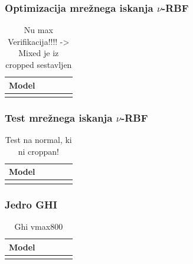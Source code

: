 \subsubsection{Optimizacija mrežnega iskanja \texorpdfstring{$\nu$}{nu}-RBF}
\begin{table}[!htbp]
	\centering
	\begin{tabular}{l S[table-format=1.2, round-mode=places, round-precision=2] S[table-format=1.2, round-mode=places, round-precision=2] S[table-format=1.2, round-mode=places, round-precision=2] S[table-format=1.2, round-mode=places, round-precision=2]}
		\toprule
		\textbf{Model} &  &  &  &  \\
		\midrule
		\bottomrule
	\end{tabular}
	\caption{Nu max Verifikacija!!!! -> Mixed je iz cropped sestavljen}
	\label{tab:nu-max}
\end{table}




\subsubsection{Test mrežnega iskanja \texorpdfstring{$\nu$}{nu}-RBF}
\begin{table}[!htbp]
	\centering
	\begin{tabular}{l S[table-format=1.2, round-mode=places, round-precision=2] S[table-format=1.2, round-mode=places, round-precision=2] S[table-format=1.2, round-mode=places, round-precision=2] S[table-format=1.2, round-mode=places, round-precision=2]}
		\toprule
		\textbf{Model} &  &  &  &  \\
		\midrule
		\bottomrule
	\end{tabular}
	\caption{Test na normal, ki ni croppan!}
	\label{tab:rbf-nu}
\end{table}





\subsubsection{Jedro GHI}
\begin{table}[!htbp]
	\centering
	\begin{tabular}{l S[table-format=1.2, round-mode=places, round-precision=2] S[table-format=1.2, round-mode=places, round-precision=2] S[table-format=1.2, round-mode=places, round-precision=2] S[table-format=1.2, round-mode=places, round-precision=2]}
		\toprule
		\textbf{Model} &  &  &  &  \\
		\midrule
		\bottomrule
	\end{tabular}
	\caption{Ghi vmax800}
	\label{tab:ghi}
\end{table}

